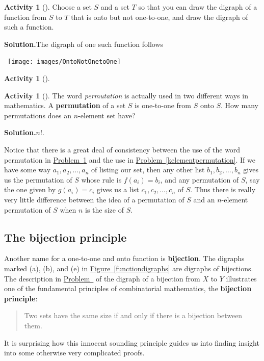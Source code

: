 \documentclass[10pt,]{book}
\newcommand{\terminology}[1]{\textbf{#1}}
\theoremstyle{plain}
\theoremstyle{definition}
\newtheorem{activity}[project]{Activity}
\numberwithin{equation}{chapter}
\begin{document}
\begin{activity}[]\label{activity-25}
Choose a set \(S\) and a set \(T\) so that you can draw the digraph of a function from \(S\) to \(T\) that is onto but not one-to-one, and draw the digraph of such a function.%
\par\medskip\noindent%
\textbf{Solution.}\quad The digraph of one such function follows%
\par
\mbox{ \texttt{[image: images/OntoNotOnetoOne]}
 }%
\end{activity}
\begin{activity}[]\label{activity-26}
\end{activity}
\begin{activity}[]\label{permutationasbijection}
The word \emph{permutation} is actually used in two different ways in mathematics. A \terminology{permutation} of a set \(S\) is one-to-one from \(S\) onto \(S\). How many permutations does an \(n\)-element set have?%
\par\medskip\noindent%
\textbf{Solution.}\quad \(n!\).%
\end{activity}
Notice that there is a great deal of consistency between the use of the word permutation in \hyperref[permutationasbijection]{Problem~\ref{permutationasbijection}} and the use in \hyperref[kelementpermutation]{Problem~\ref{kelementpermutation}}. If we have some way \(a_1,a_2,\ldots,a_n\) of listing our set, then any other list \(b_1,b_2,\ldots,b_n\) gives us the permutation of \(S\) whose rule is \(f(a_i) =b_i\), and any permutation of \(S\), say the one given by \(g(a_i)=c_i\) gives us a list \(c_1,c_2,\ldots,c_n\) of \(S\). Thus there is really very little difference between the idea of a permutation of \(S\) and an \(n\)-element permutation of \(S\) when \(n\) is the size of \(S\).%
\typeout{************************************************}
\typeout{************************************************}
\subsection[{The bijection principle}]{The bijection principle}\label{subsection-3}
Another name for a one-to-one and onto function is \terminology{bijection}. The digraphs marked (a), (b), and (e) in \hyperref[functiondigraphs]{Figure~\ref{functiondigraphs}} are digraphs of bijections. The description in \hyperref[bijectiondigraph]{Problem~} of the digraph of a bijection from \(X\) to \(Y\) illustrates one of the fundamental principles of combinatorial mathematics, the \terminology{bijection principle}:%
\begin{quote}\hypertarget{blockquote-3}{}
Two sets have the same size if and only if there is a bijection between them.\end{quote}
It is surprising how this innocent sounding principle guides us into finding insight into some otherwise very complicated proofs.%
\typeout{************************************************}
\typeout{************************************************}
\end{document}
